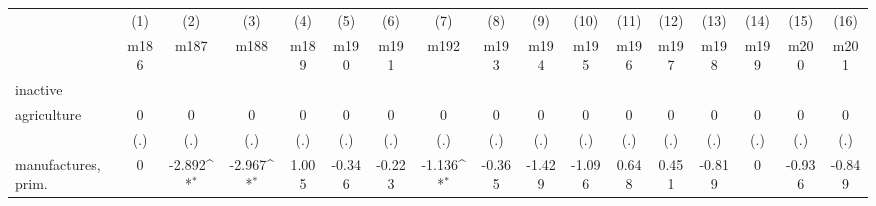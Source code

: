 {
\def\sym#1{\ifmmode^{#1}\else\(^{#1}\)\fi}
\begin{tabular}{l*{16}{c}}
\hline\hline
                    &\multicolumn{1}{c}{(1)}&\multicolumn{1}{c}{(2)}&\multicolumn{1}{c}{(3)}&\multicolumn{1}{c}{(4)}&\multicolumn{1}{c}{(5)}&\multicolumn{1}{c}{(6)}&\multicolumn{1}{c}{(7)}&\multicolumn{1}{c}{(8)}&\multicolumn{1}{c}{(9)}&\multicolumn{1}{c}{(10)}&\multicolumn{1}{c}{(11)}&\multicolumn{1}{c}{(12)}&\multicolumn{1}{c}{(13)}&\multicolumn{1}{c}{(14)}&\multicolumn{1}{c}{(15)}&\multicolumn{1}{c}{(16)}\\
                    &\multicolumn{1}{c}{m186}&\multicolumn{1}{c}{m187}&\multicolumn{1}{c}{m188}&\multicolumn{1}{c}{m189}&\multicolumn{1}{c}{m190}&\multicolumn{1}{c}{m191}&\multicolumn{1}{c}{m192}&\multicolumn{1}{c}{m193}&\multicolumn{1}{c}{m194}&\multicolumn{1}{c}{m195}&\multicolumn{1}{c}{m196}&\multicolumn{1}{c}{m197}&\multicolumn{1}{c}{m198}&\multicolumn{1}{c}{m199}&\multicolumn{1}{c}{m200}&\multicolumn{1}{c}{m201}\\
\hline
inactive            &                     &                     &                     &                     &                     &                     &                     &                     &                     &                     &                     &                     &                     &                     &                     &                     \\
agriculture         &           0         &           0         &           0         &           0         &           0         &           0         &           0         &           0         &           0         &           0         &           0         &           0         &           0         &           0         &           0         &           0         \\
                    &         (.)         &         (.)         &         (.)         &         (.)         &         (.)         &         (.)         &         (.)         &         (.)         &         (.)         &         (.)         &         (.)         &         (.)         &         (.)         &         (.)         &         (.)         &         (.)         \\
[1em]
manufactures, prim. &           0         &      -2.892\sym{*}  &      -2.967\sym{*}  &       1.005         &      -0.346         &      -0.223         &      -1.136\sym{*}  &      -0.365         &      -1.429         &      -1.096         &       0.648         &       0.451         &      -0.819         &           0         &      -0.936         &      -0.849         \\

\end{tabular}}
